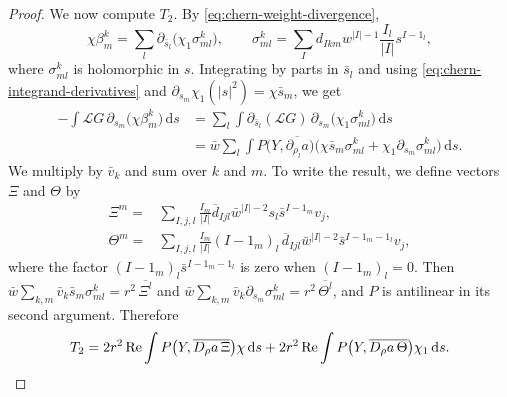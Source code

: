 \begin{proof}
We now compute $T_2$. By \eqref{eq:chern-weight-divergence},
\[
 \chi\beta^k_m=\sum_l\partial_{\bar s_l}\bigl(\chi_1\sigma^k_{ml}\bigr),\qquad \sigma^k_{ml}=\sum_Id_{Ikm}w^{|I|-1}\frac{I_l}{|I|}s^{I-1_l},
\]
where $\sigma^k_{ml}$ is holomorphic in $s$. Integrating by parts in $\bar s_l$ and using \eqref{eq:chern-integrand-derivatives} and $\partial_{s_m}\chi_1(|s|^2)=\chi\bar s_m$, we get
\begin{align*}
 -\int\mathcal LG\,\partial_{s_m}\bigl(\chi\beta^k_m\bigr)\,\mathrm ds
 &=\sum_l\int\partial_{\bar s_l}(\mathcal LG)\,\partial_{s_m}\bigl(\chi_1\sigma^k_{ml}\bigr)\,\mathrm ds\\
 &=\bar w\sum_l\int P\bigl(Y,\overline{\partial_{\rho_l}a}\bigr)\bigl(\chi\bar s_m\sigma^k_{ml}+\chi_1\partial_{s_m}\sigma^k_{ml}\bigr)\,\mathrm ds.
\end{align*}
We multiply by $\bar v_k$ and sum over $k$ and $m$. To write the result, we define vectors $\Xi$ and $\Theta$ by
\begin{align*}
 \Xi^m={}&\sum_{I,j,l}\frac{I_m}{|I|}\overline d_{Ijl}
                 \bar w^{|I|-2}s_l\bar s^{I-1_m}v_j,\\
 \Theta^m={}&\sum_{I,j,l}\frac{I_m}{|I|}(I-1_m)_l\,\overline d_{Ijl}
                 \bar w^{|I|-2}\bar s^{I-1_m-1_l}v_j,
\end{align*}
where the factor $(I-1_m)_l\bar s^{I-1_m-1_l}$ is zero when $(I-1_m)_l=0$. Then $\bar w\sum_{k,m}\bar v_k\bar s_m\sigma^k_{ml}=r^2\,\overline{\Xi^l}$ and $\bar w\sum_{k,m}\bar v_k\partial_{s_m}\sigma^k_{ml}=r^2\,\overline{\Theta^l}$, and $P$ is antilinear in its second argument. Therefore
\[
 T_2=2r^2\operatorname{Re}\int P\bigl(Y,\overline{D_\rho a\,\Xi}\bigr)\chi\,\mathrm ds+2r^2\operatorname{Re}\int P\bigl(Y,\overline{D_\rho a\,\Theta}\bigr)\chi_1\,\mathrm ds.
\]


\end{proof}
